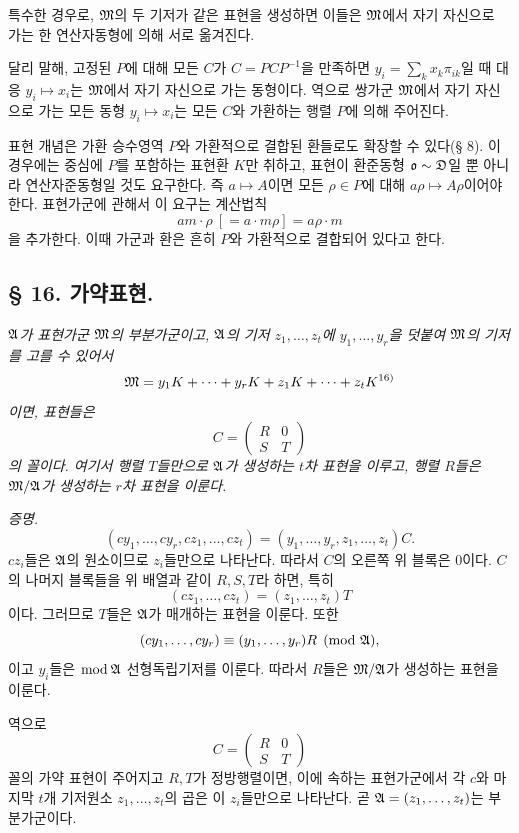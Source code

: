 특수한 경우로, \(\mathfrak M\)의 두 기저가 같은 표현을 생성하면 이들은 \(\mathfrak M\)에서 자기 자신으로 가는 한 연산자동형에 의해 서로 옮겨진다.

달리 말해, 고정된 \(P\)에 대해 모든 \(C\)가 \(C=PCP^{-1}\)을 만족하면 \(y_i=\sum_kx_k\pi_{ik}\)일 때 대응 \(y_i\mapsto x_i\)는 \(\mathfrak M\)에서 자기 자신으로 가는 동형이다. 역으로 쌍가군 \(\mathfrak M\)에서 자기 자신으로 가는 모든 동형 \(y_i\mapsto x_i\)는 모든 \(C\)와 가환하는 행렬 \(P\)에 의해 주어진다.

표현 개념은 가환 승수영역 \(P\)와 가환적으로 결합된 환들로도 확장할 수 있다(§ 8). 이 경우에는 중심에 \(P\)를 포함하는 표현환 \(K\)만 취하고, 표현이 환준동형 \(\mathfrak o\sim\mathfrak D\)일 뿐 아니라 연산자준동형일 것도 요구한다. 즉 \(a\mapsto A\)이면 모든 \(\rho\in P\)에 대해 \(a\rho\mapsto A\rho\)이어야 한다.
표현가군에 관해서 이 요구는 계산법칙
\[
        am\cdot\rho\ [=a\cdot m\rho]=a\rho\cdot m
\]
을 추가한다. 이때 가군과 환은 흔히 \glqq{}\(P\)와 가환적으로 결합되어 있다\grqq{}고 한다.

\subsection*{§ 16. 가약표현.}

\emph{\(\mathfrak A\)가 표현가군 \(\mathfrak M\)의 부분가군이고, \(\mathfrak A\)의 기저 \(z_1,\ldots,z_t\)에 \(y_1,\ldots,y_r\)을 덧붙여 \(\mathfrak M\)의 기저를 고를 수 있어서}
\[
        \mathfrak M=y_1K+\cdots+y_rK+z_1K+\cdots+z_tK\textsuperscript{16)}
\]
\emph{이면, 표현들은}
\[
        C=\begin{pmatrix}R&0\\ S&T\end{pmatrix}
\]
\emph{의 꼴이다. 여기서 행렬 \(T\)들만으로 \(\mathfrak A\)가 생성하는 \(t\)차 표현을 이루고, 행렬 \(R\)들은 \(\mathfrak M/\mathfrak A\)가 생성하는 \(r\)차 표현을 이룬다.}

\emph{증명.} 
\[
        (cy_1,\ldots,cy_r,cz_1,\ldots,cz_t)
        =(y_1,\ldots,y_r,z_1,\ldots,z_t)C.
\]
\(cz_i\)들은 \(\mathfrak A\)의 원소이므로 \(z_i\)들만으로 나타난다. 따라서 \(C\)의 오른쪽 위 블록은 0이다. \(C\)의 나머지 블록들을 위 배열과 같이 \(R,S,T\)라 하면, 특히
\[
        (cz_1,\ldots,cz_t)=(z_1,\ldots,z_t)T
\]
이다. 그러므로 \(T\)들은 \(\mathfrak A\)가 매개하는 표현을 이룬다. 또한
\[
        (cy_1,\ldots,cy_r)\equiv
        (y_1,\ldots,y_r)R\pmod{\mathfrak A},
\]
이고 \(y_i\)들은 \(\bmod\,\mathfrak A\) 선형독립기저를 이룬다. 따라서 \(R\)들은 \(\mathfrak M/\mathfrak A\)가 생성하는 표현을 이룬다.

역으로
\[
        C=\begin{pmatrix}R&0\\ S&T\end{pmatrix}
\]
꼴의 \glqq{}가약\grqq{} 표현이 주어지고 \(R,T\)가 정방행렬이면, 이에 속하는 표현가군에서 각 \(c\)와 마지막 \(t\)개 기저원소 \(z_1,\ldots,z_t\)의 곱은 이 \(z_i\)들만으로 나타난다. 곧 \(\mathfrak A=(z_1,\ldots,z_t)\)는 부분가군이다.

